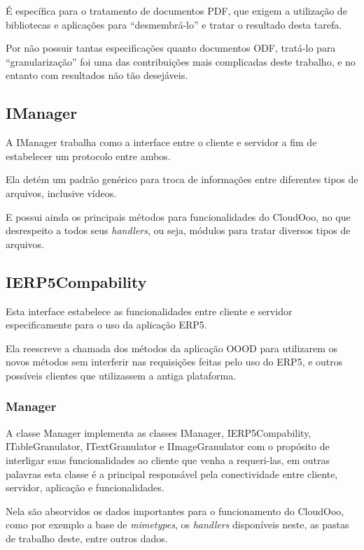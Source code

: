 É específica para o tratamento de documentos PDF, que exigem a utilização de bibliotecas e aplicações para ``desmembrá-lo'' e tratar o resultado desta tarefa.

Por não possuir tantas especificações quanto documentos ODF, tratá-lo para ``granularização'' foi uma das contribuições mais complicadas deste trabalho, e no entanto com resultados não tão desejáveis.

\subsection{IManager}

A IManager trabalha como a interface entre o cliente e servidor a fim de estabelecer um protocolo entre ambos.

Ela detém um padrão genérico para troca de informações entre diferentes tipos de arquivos, inclusive vídeos. 

E possui ainda os principais métodos para funcionalidades do CloudOoo, no que desrespeito a todos seus \textit{handlers}, ou seja, módulos para tratar diversos tipos de arquivos.


\subsection{IERP5Compability}

Esta interface estabelece as funcionalidades entre cliente e servidor especificamente para o uso da aplicação ERP5. 

Ela reescreve a chamada dos métodos da aplicação OOOD para utilizarem os novos métodos sem interferir nas requisições feitas pelo uso do ERP5, e outros possíveis clientes que utilizassem a antiga plataforma.


\subsubsection{Manager}
\label{manager}

A classe Manager implementa as classes IManager, IERP5Compability, ITableGranulator, ITextGranulator e IImageGranulator com o propósito de interligar suas funcionalidades ao cliente que venha a requeri-las, em outras palavras esta classe é a principal responsável pela conectividade entre cliente, servidor, aplicação e funcionalidades.

Nela são absorvidos os dados importantes para o funcionamento do CloudOoo, como por exemplo a base de \textit{mimetypes}, os \textit{handlers} disponíveis neste, as pastas de trabalho deste, entre outros dados.

